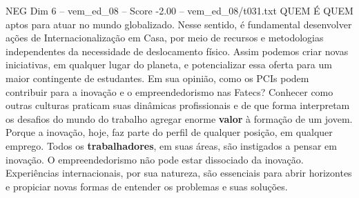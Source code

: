 \begin{textsample}{NEG Dim 6 – vem\_ed\_08 – Score -2.00 – vem\_ed\_08/t031.txt}  \label{ex:f6_neg_098}
QUEM É QUEM aptos para atuar no mundo globalizado.
Nesse sentido, é fundamental desenvolver ações de Internacionalização em Casa, por meio de recursos e metodologias independentes da necessidade de deslocamento físico.
Assim podemos criar novas iniciativas, em qualquer lugar do planeta, e potencializar essa oferta para um maior contingente de estudantes.
Em sua opinião, como os PCIs podem contribuir para a inovação e o empreendedorismo nas Fatecs?
Conhecer como outras culturas praticam suas dinâmicas profissionais e de que forma interpretam os desafios do mundo do trabalho agregar enorme \textbf{valor} à formação de um jovem.
Porque a inovação, hoje, faz parte do perfil de qualquer posição, em qualquer emprego.
Todos os \textbf{trabalhadores}, em suas áreas, são instigados a pensar em inovação.
O empreendedorismo não pode estar dissociado da inovação.
Experiências internacionais, por sua natureza, são essenciais para abrir horizontes e propiciar novas formas de entender os problemas e suas soluções.

\end{textsample}
